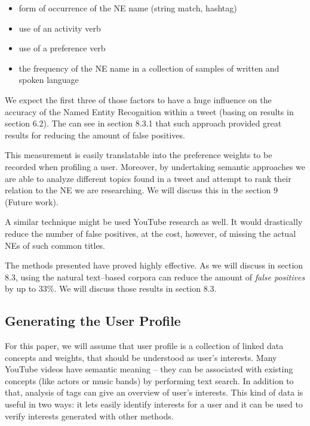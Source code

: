 \begin{itemize}
  \item form of occurrence of the NE name (string match, hashtag)
  \item use of an activity verb
  \item use of a preference verb
  \item the frequency of the NE name in a collection of samples of written and spoken language
\end{itemize}

We expect the first three of those factors to have a huge influence on the accuracy of the Named Entity Recognition within
a tweet (basing on results in section 6.2). The can see in section 8.3.1 that such approach provided great results for
reducing the amount of false positives.

This measurement is easily translatable into the preference weights to be recorded when profiling a user.
Moreover, by undertaking semantic approaches we are able to analyze different topics found in a tweet and
attempt to rank their relation to the NE we are researching. We will discuss this in the section 9 (Future work).

A similar technique might be used YouTube research as well. It would drastically reduce the number of
false positives, at the cost, however, of missing the actual NEs of such common titles.

The methods presented have proved highly effective. As we will discuss in section 8.3, using the natural
text--based corpora can reduce the amount of \textit{false positives} by up to 33\%. We will discuss those
results in section 8.3.

\subsection{Generating the User Profile}

For this paper, we will assume that user profile is a collection of linked data concepts and weights,
that should be understood as user's interests. Many YouTube videos have semantic meaning -- they can
be associated with existing concepts (like actors or music bands) by performing text search.
In addition to that, analysis of tags can give an overview of user's interests. This kind of data is
useful in two ways: it lets easily identify interests for a user and it can be
used to verify interests generated with other methods.

